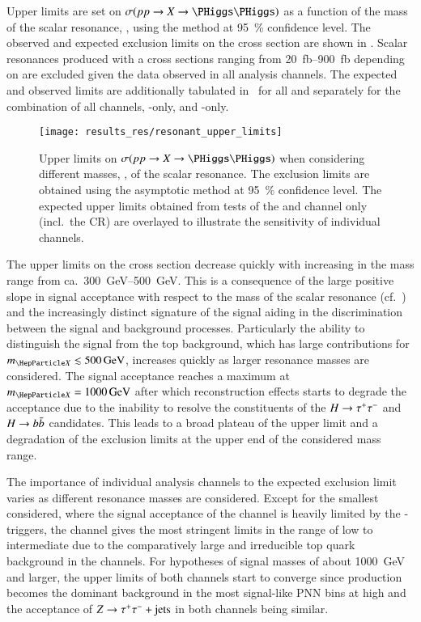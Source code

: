 Upper limits are set on $\sigma(pp \to X \to \HH)$ as a function of the mass of
the scalar resonance, \mX, using the \CLs method at \SI{95}{\percent} confidence
level. The observed and expected exclusion limits on the cross section are shown
in . Scalar resonances produced with a cross sections
ranging from \SIrange{20}{900}{\femto\barn} depending on \mX are excluded given
the data observed in all analysis channels. The expected and observed limits are
additionally tabulated in~ for all \mX and separately for
the combination of all channels, \lephad-only, and \hadhad-only.

\begin{figure}[htbp]
  \centering

  \texttt{[image: results\_res/resonant\_upper\_limits]}

  \caption{Upper limits on $\sigma(pp \to X \to \HH)$ when considering different
    masses, \mX, of the scalar resonance. The exclusion limits are obtained
    using the asymptotic \CLs method at \SI{95}{\percent} confidence level. The
    expected upper limits obtained from tests of the \lephad and \hadhad channel
    only (incl.\ the CR) are overlayed to illustrate the sensitivity of
    individual channels.}%
  \label{fig:res_upper_limits}
\end{figure}

The upper limits on the cross section decrease quickly with increasing \mX in
the mass range from ca.\ \SIrange{300}{500}{\GeV}. This is a consequence of the
large positive slope in signal acceptance with respect to the mass of the scalar
resonance (cf.~) and the increasingly
distinct signature of the signal aiding in the discrimination between the signal
and background processes. Particularly the ability to distinguish the signal
from the top background, which has large contributions for
$\mX \lesssim \SI{500}{\GeV}$,
increases quickly as larger resonance masses are considered. The signal
acceptance reaches a maximum at $\mX = \SI{1000}{\GeV}$ after which
reconstruction effects starts to degrade the acceptance due to the inability to
resolve the constituents of the $H \to \tau^{+} \tau^{-}$ and $H \to b\bar{b}$
candidates. This leads to a broad plateau of the upper limit and a degradation
of the exclusion limits at the upper end of the considered mass range.

The importance of individual analysis channels to the expected exclusion limit
varies as different resonance masses are considered. Except for the smallest \mX
considered, where the signal acceptance of the \hadhad channel is heavily
limited by the \tauhadvis-triggers, the \hadhad channel gives the most stringent
limits in the range of low to intermediate \mX due to the comparatively large
and irreducible top quark background in the \lephad channels. For hypotheses of
signal masses of about \SI{1000}{\GeV} and larger, the upper limits of both
channels start to converge since \Zjets production becomes the dominant
background in the most signal-like PNN bins at high \mX and the acceptance of
$Z \to \tau^{+} \tau^{-} + \text{jets}$ in both channels being similar.

